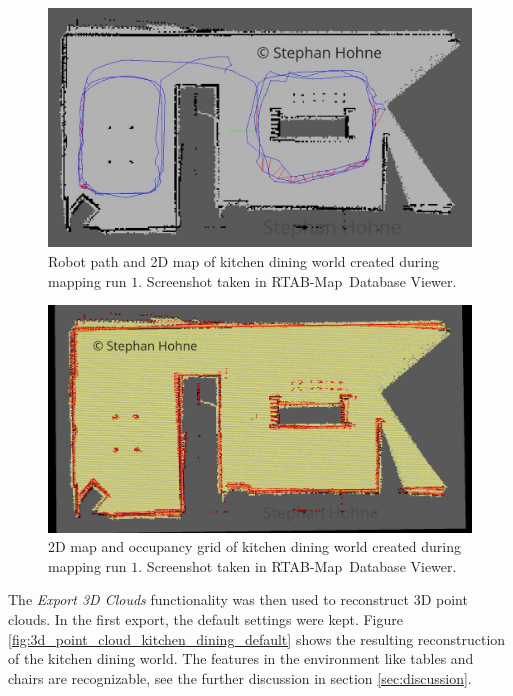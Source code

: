 \documentclass[10pt, journal, compsoc]{IEEEtran}
\newcommand{\rtab}{RTAB-Map}
\begin{document}
\begin{figure}[thpb]
      \centering
      \includegraphics[width=\columnwidth]{images/graph_view_kitchen_dining_small.jpg}
      \caption{Robot path and 2D map of kitchen dining world created during mapping run $1$. Screenshot taken in \rtab\ Database Viewer.}
      \label{fig:graph_view_kitchen_dining_small}
\end{figure}

\begin{figure}[thpb]
      \centering
      \includegraphics[width=\columnwidth]{images/occupancy_grid_kitchen_dining.jpg}
      \caption{2D map and occupancy grid of kitchen dining world created during mapping run $1$. Screenshot taken in \rtab\ Database Viewer.}
      \label{fig:occupancy_grid_kitchen_dining}
\end{figure}

The \emph{Export 3D Clouds} functionality was then used to reconstruct 3D point clouds. In the first export, the default settings were kept. Figure \ref{fig:3d_point_cloud_kitchen_dining_default} shows the resulting reconstruction of the kitchen dining world. The features in the environment like tables and chairs are recognizable, see the further discussion in section \ref{sec:discussion}.
\end{document}
